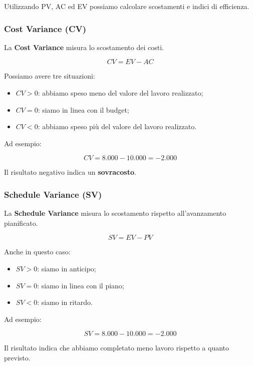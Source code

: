 \noindent Utilizzando PV, AC ed EV possiamo
calcolare scostamenti e indici
di efficienza.

\subsubsection*{Cost Variance (CV)}

\noindent La \textbf{Cost Variance}
misura lo scostamento dei costi.

\[
\boxed{
CV=EV-AC
}
\]

\noindent Possiamo avere tre situazioni:

\begin{itemize}
    \item $CV>0$: abbiamo speso meno
    del valore del lavoro realizzato;

    \item $CV=0$: siamo in linea con il budget;

    \item $CV<0$: abbiamo speso più
    del valore del lavoro realizzato.
\end{itemize}

\noindent Ad esempio:

\[
CV=8.000-10.000=\boxed{-2.000}
\]

\noindent Il risultato negativo indica
un \textbf{sovracosto}.


\subsubsection*{Schedule Variance (SV)}

\noindent La \textbf{Schedule Variance}
misura lo scostamento rispetto
all'avanzamento pianificato.

\[
\boxed{
SV=EV-PV
}
\]

\noindent Anche in questo caso:

\begin{itemize}
    \item $SV>0$: siamo in anticipo;
    \item $SV=0$: siamo in linea con il piano;
    \item $SV<0$: siamo in ritardo.
\end{itemize}

\noindent Ad esempio:

\[
SV=8.000-10.000=\boxed{-2.000}
\]

\noindent Il risultato indica che
abbiamo completato meno lavoro
rispetto a quanto previsto.

